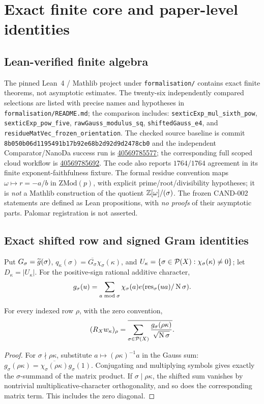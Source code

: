 \section{Exact finite core and paper-level identities}\label{sec:proof}
\subsection{Lean-verified finite algebra}
The pinned Lean~4 / Mathlib project under
\texttt{formalisation/} contains exact finite theorems,
not asymptotic estimates. The twenty-six independently
compared selections are listed with precise names and
hypotheses in \texttt{formalisation/README.md};
the comparison includes:
\texttt{sexticExp\_mul\_sixth\_pow},
\texttt{sexticExp\_pow\_five},
\texttt{rawGauss\_modulus\_sq},
\texttt{shiftedGauss\_e4}, and
\texttt{residueMatVec\_frozen\_orientation}.
The checked source baseline is commit
\texttt{8b050b06d1195491b17b92e68b2d92d9d2478cb0}
and the independent Comparator/NanoDa success run is
\href{https://github.com/jfairfaxball-348/PRIMES/actions/runs/40569785577}{40569785577};
the corresponding full scoped cloud workflow is
\href{https://github.com/jfairfaxball-348/PRIMES/actions/runs/40569785692}{40569785692}.
The code also reports \(1764/1764\) agreement in its
finite exponent-faithfulness fixture.
The formal residue convention maps
\(\omega\mapsto r=-a/b\) in \(\mathrm{ZMod}(p)\),
with explicit prime/root/divisibility hypotheses;
it is \emph{not} a Mathlib construction of
the quotient \(\mathbb Z[\omega]/(\sigma)\).
The frozen CAND-002 statements are defined as
Lean propositions, with \emph{no proofs} of
their asymptotic parts. Palomar registration is
not asserted.

\subsection{Exact shifted row and signed Gram identities}
Put \(G_\sigma=\widetilde g(\sigma)\),
\(q_\kappa(\sigma)=\overline{G_\sigma}\chi_\sigma(\kappa)\),
and \(U_\kappa=\{\sigma\in\mathcal P(X):\chi_\sigma(\kappa)\ne0\}\);
let \(D_\kappa=|U_\kappa|\).
For the positive-sign rational additive character,
\[
 g_\sigma(u)=\sum_{a\bmod\sigma}
    \chi_\sigma(a)e(\operatorname{res}_\sigma(ua)/\operatorname{N}\sigma).
\]

\begin{proposition}\label{prop:row}
For every indexed row \(\rho\), with the zero convention,
\[
 (R_X w_\kappa)_\rho=
 \overline{\sum_{\sigma\in\mathcal P(X)}
              \frac{g_\sigma(\rho\kappa)}{\sqrt{\operatorname{N}\sigma}}}.
\]
\end{proposition}
\begin{proof}
For \(\sigma\nmid \rho\kappa\), substitute
\(a\mapsto(\rho\kappa)^{-1}a\) in the Gauss sum:
\(g_\sigma(\rho\kappa)
=\overline{\chi_\sigma(\rho\kappa)}g_\sigma(1)\).
Conjugating and multiplying symbols gives exactly the
\(\sigma\)-summand of the matrix product. If
\(\sigma\mid\rho\kappa\), the shifted sum vanishes by
nontrivial multiplicative-character orthogonality,
and so does the corresponding matrix term.
This includes the zero diagonal.
\end{proof}

